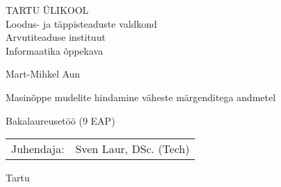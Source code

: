 \thispagestyle{empty}
\begin{center}

\large{
TARTU ÜLIKOOL\\
Loodus- ja täppisteaduste valdkond\\
Arvutiteaduse instituut\\
Informaatika õppekava\\
}

\vspace{25mm}

\Large Mart-Mihkel Aun

\vspace{4mm}

\huge Masinõppe mudelite hindamine väheste märgenditega andmetel

\vspace{20mm}

\Large{Bakalaureusetöö (9 EAP)}

\end{center}

\vspace{2mm}

\begin{flushright}
    {
    \setlength{\extrarowheight}{5pt}
    \begin{tabular}{r l} 
        \sffamily Juhendaja: & \sffamily Sven Laur, DSc. (Tech)  \\
    \end{tabular}
    }
\end{flushright}

\vfill
\centerline{\large Tartu \the\year}

